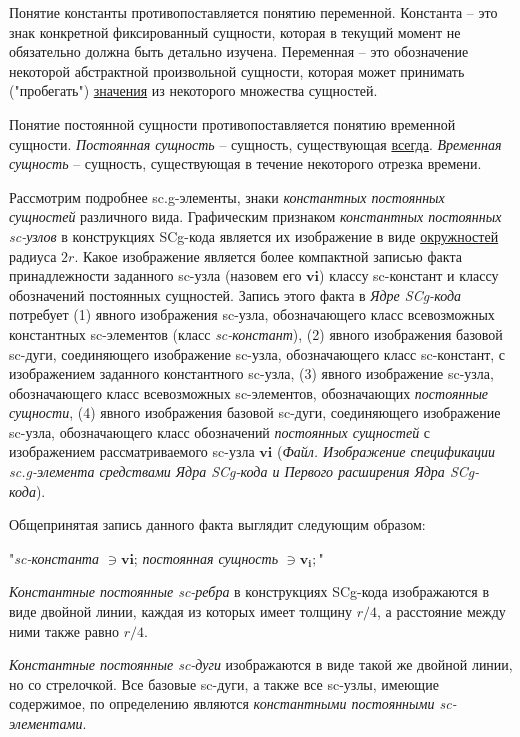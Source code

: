 \begin{SCn}
{Понятие константы противопоставляется понятию переменной. Константа -- это знак конкретной фиксированный сущности, которая в текущий момент не обязательно должна быть детально изучена. Переменная -- это обозначение некоторой абстрактной произвольной сущности, которая может принимать ("пробегать") \uline{значения} из некоторого множества сущностей. 

Понятие постоянной сущности противопоставляется понятию временной сущности. \textit{Постоянная сущность} -- сущность, существующая \uline{всегда}. \textit{Временная сущность} -- сущность, существующая в течение некоторого отрезка времени. 

Рассмотрим подробнее sc.g-элементы, знаки \textit{константных постоянных сущностей} различного вида. Графическим признаком \textit{константных постоянных sc-узлов} в конструкциях SCg-кода является их изображение в виде \uline{окружностей} радиуса $2r$. Какое изображение является более компактной записью факта принадлежности заданного sc-узла (назовем его $\bm{vi}$) классу sc-констант и классу обозначений постоянных сущностей. Запись этого факта в \textit{Ядре SCg-кода} потребует (1) явного изображения sc-узла, обозначающего класс всевозможных константных sc-элементов (класс \textit{sc-констант}), (2) явного изображения базовой sc-дуги, соединяющего изображение sc-узла, обозначающего класс sc-констант, с изображением заданного константного sc-узла, (3) явного изображение sc-узла, обозначающего класс всевозможных sc-элементов, обозначающих \textit{постоянные сущности}, (4) явного изображения базовой sc-дуги, соединяющего изображение sc-узла, обозначающего класс обозначений \textit{постоянных сущностей} с изображением рассматриваемого sc-узла $\bm{vi}$ (\textit{Файл. Изображение спецификации sc.g-элемента средствами Ядра SCg-кода и Первого расширения Ядра SCg-кода}).

Общепринятая запись данного факта выглядит следующим образом:

"\textit{sc-константа} $\ni \bm{vi}$; \textit{постоянная сущность} $\ni \bm{v_i};$"

\textit{Константные постоянные sc-ребра} в конструкциях SCg-кода изображаются в виде двойной линии, каждая из которых имеет толщину $r/4$, а расстояние между ними также равно $r/4$. 

\textit{Константные постоянные sc-дуги} изображаются в виде такой же двойной линии, но со стрелочкой. Все базовые sc-дуги, а также все sc-узлы, имеющие содержимое, по определению являются \textit{константными постоянными sc-элементами}. 

}
\end{SCn}
